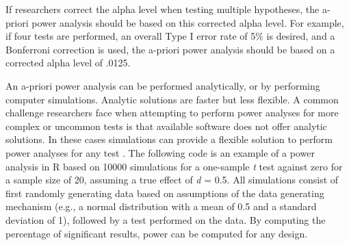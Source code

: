 \documentclass[
]{krantz}
\newenvironment{Shaded}{\begin{snugshade}}{\end{snugshade}}
\newcommand{\AttributeTok}[1]{\textcolor[rgb]{0.77,0.63,0.00}{#1}}
\newcommand{\CommentTok}[1]{\textcolor[rgb]{0.56,0.35,0.01}{\textit{#1}}}
\newcommand{\ControlFlowTok}[1]{\textcolor[rgb]{0.13,0.29,0.53}{\textbf{#1}}}
\newcommand{\DecValTok}[1]{\textcolor[rgb]{0.00,0.00,0.81}{#1}}
\newcommand{\FloatTok}[1]{\textcolor[rgb]{0.00,0.00,0.81}{#1}}
\newcommand{\FunctionTok}[1]{\textcolor[rgb]{0.00,0.00,0.00}{#1}}
\newcommand{\NormalTok}[1]{#1}
\newcommand{\OtherTok}[1]{\textcolor[rgb]{0.56,0.35,0.01}{#1}}
\newcommand{\SpecialCharTok}[1]{\textcolor[rgb]{0.00,0.00,0.00}{#1}}
\begin{document}
If researchers correct the alpha level when testing multiple hypotheses, the a-priori power analysis should be based on this corrected alpha level. For example, if four tests are performed, an overall Type I error rate of 5\% is desired, and a Bonferroni correction is used, the a-priori power analysis should be based on a corrected alpha level of .0125.

An a-priori power analysis can be performed analytically, or by performing computer simulations. Analytic solutions are faster but less flexible. A common challenge researchers face when attempting to perform power analyses for more complex or uncommon tests is that available software does not offer analytic solutions. In these cases simulations can provide a flexible solution to perform power analyses for any test \citep{morris_using_2019}. The following code is an example of a power analysis in R based on 10000 simulations for a one-sample \emph{t} test against zero for a sample size of 20, assuming a true effect of \emph{d} = 0.5. All simulations consist of first randomly generating data based on assumptions of the data generating mechanism (e.g., a normal distribution with a mean of 0.5 and a standard deviation of 1), followed by a test performed on the data. By computing the percentage of significant results, power can be computed for any design.

\begin{Shaded}
\end{Shaded}
\end{document}
